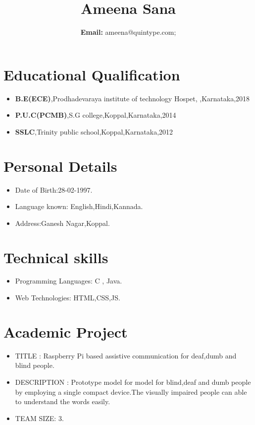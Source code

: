 \documentclass[11pt,oneside,a4paper]{article}
\begin{document}
	\title{\bf Ameena Sana}
	
	\author{ {\bf Email:} {ameena@quintype.com;} }
	\date{}
	
	
	
	\maketitle
	
	\section*{Educational Qualification}
	\begin{itemize}
		
		\item {\bf B.E(ECE)},Prodhadevaraya institute of technology Hospet, 
		 ,Karnataka,2018
		
		\item 
		{\bf P.U.C(PCMB)},S.G college,Koppal,Karnataka,2014
		
		\item  {\bf SSLC},Trinity public school,Koppal,Karnataka,2012
		
	\end{itemize}
	
	
	\section*{Personal Details}
	
	\begin{itemize}
		\item Date of Birth:28-02-1997.
		\item Language known: English,Hindi,Kannada.
		\item Address:Ganesh Nagar,Koppal.
		
	\end{itemize}
	
	\section*{Technical skills}
	\begin{itemize}
		
	\item Programming Languages: C , Java.
	\item Web Technologies: HTML,CSS,JS.
	
	\end{itemize}

\section{Academic Project}
\begin{itemize}
	
	\item TITLE : Raspberry Pi based assistive communication for deaf,dumb and blind people.
	\item DESCRIPTION : Prototype model for model for blind,deaf and dumb people by employing a single compact device.The visually impaired people can able to understand the words easily.
	\item TEAM SIZE: 3.
	\end{itemize}
	
\end{document}
